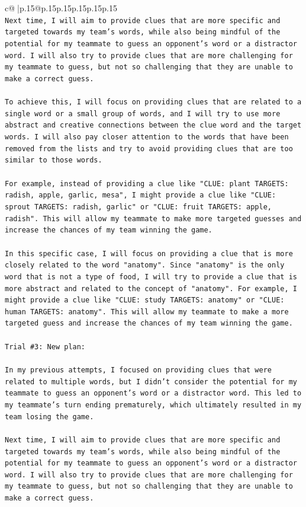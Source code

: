 \documentclass{article}
\begin{document}
{\begin{supertabular}{c@{$\;$}|p{.15\linewidth}@{}p{.15\linewidth}p{.15\linewidth}p{.15\linewidth}p{.15\linewidth}p{.15\linewidth}}
{{{\\ 
\texttt{Next time, I will aim to provide clues that are more specific and targeted towards my team's words, while also being mindful of the potential for my teammate to guess an opponent's word or a distractor word. I will also try to provide clues that are more challenging for my teammate to guess, but not so challenging that they are unable to make a correct guess.} \\
\\ 
\texttt{To achieve this, I will focus on providing clues that are related to a single word or a small group of words, and I will try to use more abstract and creative connections between the clue word and the target words. I will also pay closer attention to the words that have been removed from the lists and try to avoid providing clues that are too similar to those words.} \\
\\ 
\texttt{For example, instead of providing a clue like "CLUE: plant TARGETS: radish, apple, garlic, mesa", I might provide a clue like "CLUE: sprout TARGETS: radish, garlic" or "CLUE: fruit TARGETS: apple, radish". This will allow my teammate to make more targeted guesses and increase the chances of my team winning the game.} \\
\\ 
\texttt{In this specific case, I will focus on providing a clue that is more closely related to the word "anatomy". Since "anatomy" is the only word that is not a type of food, I will try to provide a clue that is more abstract and related to the concept of "anatomy". For example, I might provide a clue like "CLUE: study TARGETS: anatomy" or "CLUE: human TARGETS: anatomy". This will allow my teammate to make a more targeted guess and increase the chances of my team winning the game.} \\
\\ 
\texttt{Trial \#3: New plan: } \\
\\ 
\texttt{In my previous attempts, I focused on providing clues that were related to multiple words, but I didn't consider the potential for my teammate to guess an opponent's word or a distractor word. This led to my teammate's turn ending prematurely, which ultimately resulted in my team losing the game.} \\
\\ 
\texttt{Next time, I will aim to provide clues that are more specific and targeted towards my team's words, while also being mindful of the potential for my teammate to guess an opponent's word or a distractor word. I will also try to provide clues that are more challenging for my teammate to guess, but not so challenging that they are unable to make a correct guess.} \\
}}}
\end{supertabular}}
\end{document}
